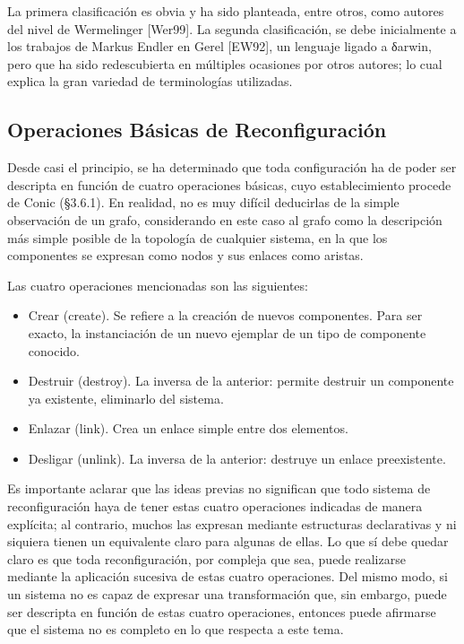 La primera clasificación es obvia y ha sido planteada, entre otros, como autores del nivel de Wermelinger [Wer99]. La segunda clasificación, se debe inicialmente a los trabajos de Markus
Endler en Gerel [EW92], un lenguaje ligado a δarwin, pero que ha sido redescubierta
en múltiples ocasiones por otros autores; lo cual explica la gran variedad de
terminologías utilizadas.


\subsection{Operaciones Básicas de Reconfiguración}

Desde casi el principio, se ha determinado que toda configuración ha de poder
ser descripta en función de cuatro operaciones básicas, cuyo establecimiento
procede de Conic (§3.6.1). En realidad, no es muy difícil deducirlas de la
simple observación de un grafo, considerando en este caso al grafo como la
descripción más simple posible de la topología de cualquier sistema, en la
que los componentes se expresan como nodos y sus enlaces como aristas.

Las cuatro operaciones mencionadas son las siguientes:

\begin{itemize}

\item 
Crear (create). Se refiere a la creación de nuevos componentes.  Para ser
exacto, la instanciación de un nuevo ejemplar de un tipo de componente conocido. 

\item
Destruir (destroy). La inversa de la anterior: permite destruir un
componente ya
existente, eliminarlo del sistema.

\item
Enlazar (link). Crea un enlace simple entre dos elementos.

\item 
Desligar (unlink). La inversa de la anterior: destruye un enlace
preexistente.

\end{itemize}

Es importante aclarar que las ideas previas no significan que todo sistema de reconfiguración haya de tener
estas cuatro operaciones indicadas de manera explícita; al contrario, muchos
las expresan mediante estructuras declarativas y ni siquiera tienen
un equivalente claro para algunas de ellas. Lo que sí debe quedar claro es que toda reconfiguración, por compleja que sea, puede realizarse     
mediante la aplicación sucesiva de estas cuatro operaciones. Del mismo modo, si
un sistema no es capaz de expresar una transformación que, sin embargo, puede
ser descripta en función de estas cuatro operaciones, entonces puede afirmarse que el sistema no es
completo en lo que respecta a este tema. 

